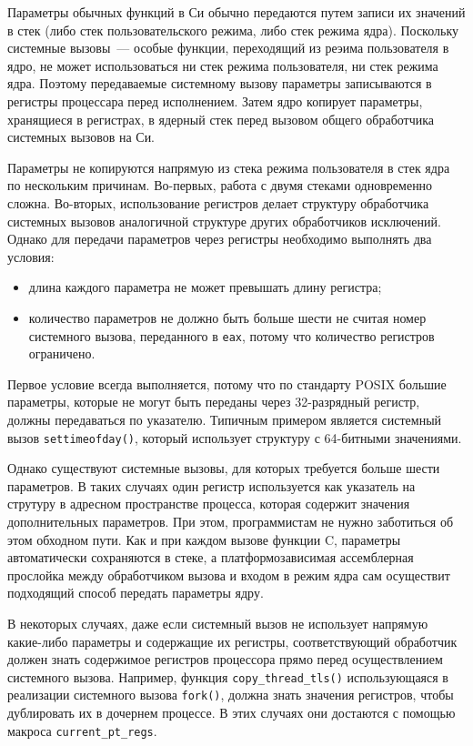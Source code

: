 Параметры обычных функций в Си обычно передаются путем записи их значений в стек
(либо стек пользовательского режима, либо стек режима ядра). Поскольку системные
вызовы~--- особые функции, переходящий из реэима пользователя в ядро, не может
использоваться ни стек режима пользователя, ни стек режима ядра. Поэтому
передаваемые системному вызову параметры записываются в регистры процессара
перед исполнением. Затем ядро копирует параметры, хранящиеся в регистрах, в
ядерный стек перед вызовом общего обработчика системных вызовов на Си.

Параметры не копируются напрямую из стека режима пользователя в стек ядра по
нескольким причинам. Во-первых, работа с двумя стеками одновременно сложна.
Во-вторых, использование регистров делает структуру обработчика системных
вызовов аналогичной структуре других обработчиков исключений. Однако для
передачи параметров через регистры необходимо выполнять два условия:
\begin{itemize}
\item длина каждого параметра не может превышать длину регистра;
\item количество параметров не должно быть больше шести не считая номер
  системного вызова, переданного в \texttt{eax}, потому что количество регистров
  ограничено.
\end{itemize}

Первое условие всегда выполняется, потому что по стандарту POSIX большие
параметры, которые не могут быть переданы через 32-разрядный регистр, должны
передаваться по указателю. Типичным примером является системный вызов
\texttt{settimeofday()}, который использует структуру с 64-битными значениями.

Однако существуют системные вызовы, для которых требуется больше шести
параметров. В таких случаях один регистр используется как указатель на струтуру
в адресном пространстве процесса, которая содержит значения дополнительных
параметров. При этом, программистам не нужно заботиться об этом обходном пути.
Как и при каждом вызове функции C, параметры автоматически сохраняются в стеке,
а платформозависимая ассемблерная прослойка между обработчиком вызова и входом в
режим ядра сам осуществит подходящий способ передать параметры ядру.

В некоторых случаях, даже если системный вызов не использует напрямую какие-либо
параметры и содержащие их регистры, соответствующий обработчик должен знать
содержимое регистров процессора прямо перед осуществлением системного вызова.
Например, функция \texttt{copy\_thread\_tls()} использующаяся в реализации системного
вызова \texttt{fork()}, должна знать значения регистров, чтобы дублировать их в
дочернем процессе. В этих случаях они достаются с помощью макроса \texttt{current\_pt\_regs}.

